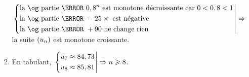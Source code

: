 \documentclass[a4paper,11pt]{article}
\begin{document}
\begin{enumerate}
\begin{enumerate}
		$\left. \begin{dcases} \text{la \og partie \fg~} 0,8^n \text{ est monotone décroissante car } 0< 0,8 < 1 \\ \text{la \og partie \fg~} -25 \times \text{ est négative} \\ \text{la \og partie \fg~} +90 \text{ ne change rien} \end{dcases} \right| \Rightarrow$ la suite $\left( u_n \right)$ est monotone croissante.
		\item En tabulant, $\left. \begin{dcases} u_{7} \approx 84,73 \\ u_{8} \approx 85,81 \end{dcases} \right| \Rightarrow n \geqslant 8$.
	\end{enumerate}
\end{enumerate}

\smallskip


\smallskip
\end{document}
